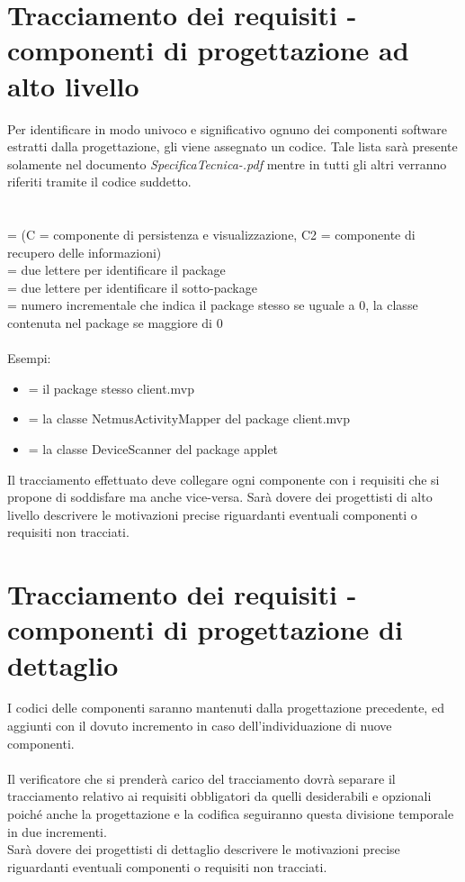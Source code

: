 \section{Tracciamento dei requisiti - componenti di progettazione ad alto
livello} Per identificare in modo univoco e significativo ognuno dei componenti
software estratti dalla progettazione, gli viene assegnato un codice.
Tale lista sar\`a presente solamente nel documento
\emph{SpecificaTecnica-\versioneST.pdf} mentre in tutti gli altri verranno
riferiti tramite il codice suddetto.
\\
\\
\\
 = (C = componente di persistenza e visualizzazione, C2 = componente di
recupero delle informazioni)\\  = due lettere per identificare il
package\\  = due lettere per identificare il sotto-package\\
 = numero incrementale che indica il package stesso se uguale a 0, la
classe contenuta nel package se maggiore di 0\\ \\
Esempi:
\begin{itemize}
  \item {} = il package stesso client.mvp
  \item {} = la classe NetmusActivityMapper del package client.mvp
  \item {} = la classe DeviceScanner del package applet
\end{itemize}

Il tracciamento effettuato deve collegare ogni componente con i requisiti che si
propone di soddisfare ma anche vice-versa. Sar\`a dovere dei progettisti di alto
livello descrivere le motivazioni precise riguardanti eventuali componenti o
requisiti non tracciati.

\section{Tracciamento dei requisiti - componenti di progettazione di dettaglio}
I codici delle componenti saranno mantenuti dalla progettazione precedente, ed
aggiunti con il dovuto incremento in caso dell'individuazione di nuove
componenti.\\\\
Il verificatore che si prender\`a carico del tracciamento dovr\`a separare il
tracciamento relativo ai requisiti obbligatori da quelli desiderabili e
opzionali poich\'e anche la progettazione e la codifica seguiranno questa
divisione temporale in due incrementi.\\
Sar\`a dovere dei progettisti di dettaglio descrivere le motivazioni precise
riguardanti eventuali componenti o requisiti non tracciati.

